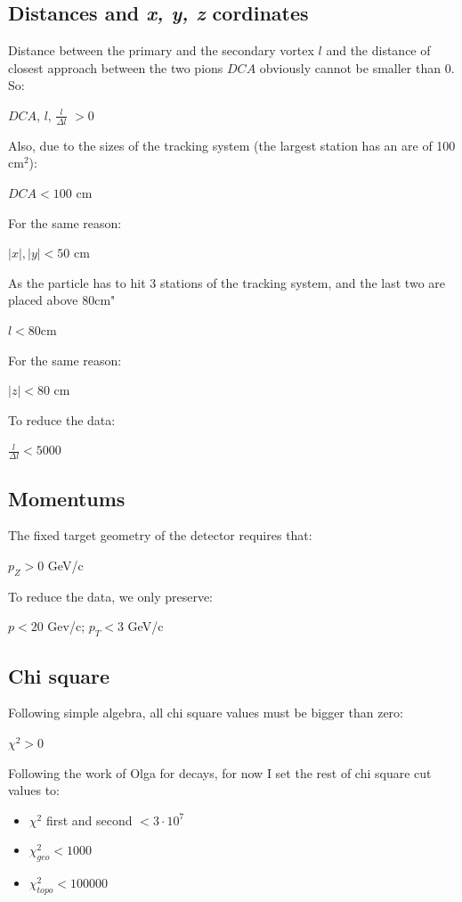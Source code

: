 \documentclass[11pt,a4paper]{article}
\begin{document}
\subsection{Distances and \emph{x, y, z} cordinates}
Distance between the primary and the secondary vortex $l$ and the distance of closest approach between the two pions $DCA$ obviously cannot be smaller than 0. So:
\begin{center}
    $DCA$, $l$, $\frac{l}{\Delta l}$ $> 0$
\end{center}
Also, due to the sizes of the tracking system (the largest station has an are of 100 cm$^2$):
\begin{center}
    $DCA < 100 $ cm
\end{center}
For the same reason:
\begin{center}
    $|x|, |y| < 50$ cm
\end{center}
As the particle has to hit 3 stations of the tracking system, and the last two are placed above 80cm"
\begin{center}
    $l < 80$cm
\end{center}
For the same reason:
\begin{center}
    $|z| < 80$ cm
\end{center}
To reduce the data:
\begin{center}
    $\frac{l}{\Delta l} < 5000$
\end{center}
\subsection{Momentums}
The fixed target geometry of the detector requires that:
\begin{center}
    $p_Z > 0 $ GeV/c
\end{center}
To reduce the data, we only preserve:
\begin{center}
    $p < 20$ Gev/c; $p_T < 3$ GeV/c
\end{center}
\subsection{Chi square}
Following simple algebra, all chi square values must be bigger than zero:
\begin{center}
    $\chi^2 > 0$
\end{center}
Following the work of Olga for \PLambda decays, for now I set the rest of chi square cut values to:
\begin{itemize}
    \item $\chi^2$ first and second $< 3 \cdot 10^7$
    \item $\chi^2_{geo} < 1000$
    \item $\chi^2_{topo} < 100000$
\end{itemize}
\end{document}
